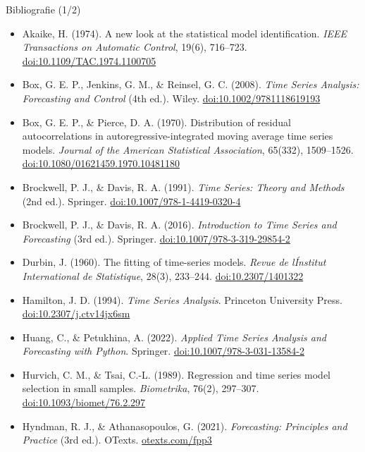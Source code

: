 \begin{frame}{Bibliografie (1/2)}
\itemsize{\scriptsize}
\begin{itemize}
    \item Akaike, H. (1974). A new look at the statistical model identification. \textit{IEEE Transactions on Automatic Control}, 19(6), 716--723. \href{https://doi.org/10.1109/TAC.1974.1100705}{doi:10.1109/TAC.1974.1100705}
    \item Box, G. E. P., Jenkins, G. M., \& Reinsel, G. C. (2008). \textit{Time Series Analysis: Forecasting and Control} (4th ed.). Wiley. \href{https://doi.org/10.1002/9781118619193}{doi:10.1002/9781118619193}
    \item Box, G. E. P., \& Pierce, D. A. (1970). Distribution of residual autocorrelations in autoregressive-integrated moving average time series models. \textit{Journal of the American Statistical Association}, 65(332), 1509--1526. \href{https://doi.org/10.1080/01621459.1970.10481180}{doi:10.1080/01621459.1970.10481180}
    \item Brockwell, P. J., \& Davis, R. A. (1991). \textit{Time Series: Theory and Methods} (2nd ed.). Springer. \href{https://doi.org/10.1007/978-1-4419-0320-4}{doi:10.1007/978-1-4419-0320-4}
    \item Brockwell, P. J., \& Davis, R. A. (2016). \textit{Introduction to Time Series and Forecasting} (3rd ed.). Springer. \href{https://doi.org/10.1007/978-3-319-29854-2}{doi:10.1007/978-3-319-29854-2}
    \item Durbin, J. (1960). The fitting of time-series models. \textit{Revue de l\'Institut International de Statistique}, 28(3), 233--244. \href{https://doi.org/10.2307/1401322}{doi:10.2307/1401322}
    \item Hamilton, J. D. (1994). \textit{Time Series Analysis}. Princeton University Press. \href{https://doi.org/10.2307/j.ctv14jx6sm}{doi:10.2307/j.ctv14jx6sm}
    \item Huang, C., \& Petukhina, A. (2022). \textit{Applied Time Series Analysis and Forecasting with Python}. Springer. \href{https://doi.org/10.1007/978-3-031-13584-2}{doi:10.1007/978-3-031-13584-2}
    \item Hurvich, C. M., \& Tsai, C.-L. (1989). Regression and time series model selection in small samples. \textit{Biometrika}, 76(2), 297--307. \href{https://doi.org/10.1093/biomet/76.2.297}{doi:10.1093/biomet/76.2.297}
    \item Hyndman, R. J., \& Athanasopoulos, G. (2021). \textit{Forecasting: Principles and Practice} (3rd ed.). OTexts. \href{https://otexts.com/fpp3/}{otexts.com/fpp3}
\end{itemize}
\end{frame}

